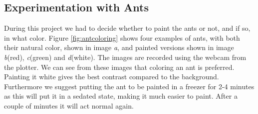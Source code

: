 
\subsection{Experimentation with Ants}
\label{ants}

During this project we had to decide whether to paint the ants or not, and if so, in what color. Figure \ref{fig:antcoloring} shows four examples of ants, with both their natural color, shown in image \emph{a}, and painted versions shown in image \emph{b}(red), \emph{c}(green) and \emph{d}(white). The images are recorded using the webcam from the plotter. We can see from these images that coloring an ant is preferred. Painting it white gives the best contrast compared to the background. Furthermore we suggest putting the ant to be painted in a freezer for 2-4 minutes as this will put it in a sedated state, making it much easier to paint. After a couple of minutes it will act normal again.\\

